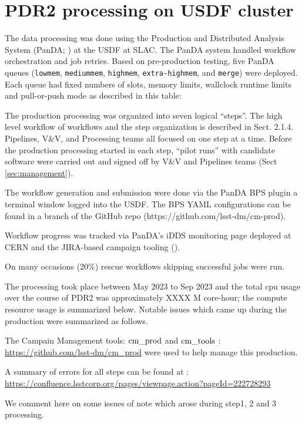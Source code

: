 \section{PDR2 processing on USDF cluster} \label{sec:processing}

The data processing was done using the Production and Distributed Analysis System (PanDA; ) at the USDF at SLAC.
The PanDA system handled workflow orchestration and job retries.
Based on pre-production testing, five PanDA queues (\texttt{lowmem}, \texttt{mediummem}, \texttt{highmem}, \texttt{extra-highmem}, and  \texttt{merge}) were deployed. Each queue had fixed numbers of slots, memory limits, wallclock runtime limits and pull-or-push mode as described in this table:

The production processing was organized into seven logical ``steps''.
The high level workflow of workflows and the step organization is described in  Sect. 2.1.4.
Pipelines, V\&V, and Processing teams all focused on one step at a time.
Before the production processing started in each step, ``pilot runs'' with candidate software were carried out and signed off by V\&V and Pipelines teams
(Sect \ref{sec:management}).

The workflow generation and submission were done via the PanDA BPS plugin a terminal window logged into the USDF.
The BPS YAML configurations can be found in a branch of the  GitHub repo (https://github.com/lsst-dm/cm-prod).

Workflow progress was tracked via PanDA's iDDS monitoring page deployed at CERN and the JIRA-based campaign tooling ().

On many occasions (20\%) rescue workflows skipping successful jobs were run.

The processing took place  between May 2023 to Sep 2023 and the total cpu usage over the course of PDR2 was approximately XXXX M core-hour; the compute resource usage is summarized below.
Notable issues which came up during the production were summarized as follows.

The Campain Management tools: $\rm cm\_prod$ and $\rm cm\_tools$ : \url{https://github.com/lsst-dm/cm_prod} were used to help manage this production.  

A summary of errors for all steps can be found at : \url{https://confluence.lsstcorp.org/pages/viewpage.action?pageId=222728293}

We comment here on some issues of note which arose during step1, 2 and 3 processing.

